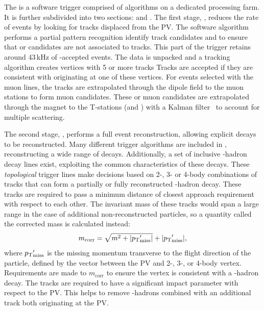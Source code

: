 The \hlt is a software trigger comprised of \cpp algorithms on a dedicated processing farm. It is further subdivided into two sections: \hltone and \hlttwo. 
The first stage, \hltone, reduces the rate of events by looking for tracks displaced from the PV.
The software algorithm performs a partial pattern recognition identify track candidates and to ensure that \Pgamma or \piz \lone candidates are not associated to tracks. This part of the trigger retains around 43\,kHz of \lone-accepted events.
The \velo data is unpacked and a tracking algorithm creates vertices with 5 or more tracks
Tracks are accepted if they are consistent with originating at one of these vertices. For events selected with the muon \lone lines, the \velo tracks are extrapolated through the dipole field to the muon stations to form muon candidates. These \velo or muon candidates are extrapolated through the magnet to the T-stations (\ot and \intr) with a Kalman filter~\cite{Kalmanone,FRUHWIRTH1987444} to account for multiple scattering.




The second stage, \hlttwo, performs a full event reconstruction, allowing explicit decays to be reconstructed. Many different trigger algorithms are included in \hlttwo, reconstructing a wide range of decays. Additionally, a set of inclusive \bquark-hadron decay lines exist, exploiting the common characteristics of these decays. These \emph{topological} trigger lines make decisions based on 2-, 3- or 4-body combinations of tracks that can form a partially or fully reconstructed \bquark-hadron decay. These tracks are required to pass a minimum distance of closest approach requirement with respect to each other. The invariant mass of these tracks would span a large range in the case of additional non-reconstructed particles, so a quantity called the corrected mass is calculated instead:
\begin{equation}
m_{\text{corr}} = \sqrt{m^{2} + |\mbox{$p_{\mathrm{ T}}$}'_{\text{miss}}|} + |\mbox{$p_{\mathrm{ T}}$}'_{\text{miss}}|,
\end{equation}   
where $\mbox{$p_{\mathrm{ T}}$}'_{\text{miss}}$ is the missing momentum transverse to the flight direction of the particle, defined by the vector between the PV and 2-, 3-, or 4-body vertex. Requirements are made to $m_{\text{corr}}$ to ensure the vertex is consistent with a \bquark-hadron decay.
The tracks are required to have a significant impact parameter with respect to the PV. This helps to remove \cquark-hadrons combined with an additional track both originating at the PV.




